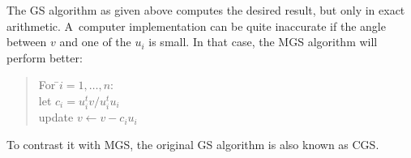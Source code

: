 The \ac{GS} algorithm as given above computes the desired result,
but only in exact arithmetic. A~computer implementation can be quite
inaccurate if the angle between $v$ and one of the $u_i$ is small. In
that case, the \acf{MGS} algorithm will
perform better:

\begin{quote}
  \begin{tabbing}
    For \=$i=1,\ldots,n$:\\
    \>let $c_i=u_i^tv/u_i^tu_i$\\
    \>update $v\leftarrow v-c_iu_i$
  \end{tabbing}
\end{quote}

To contrast it with \ac{MGS}, the original \ac{GS} algorithm is also
known as \acf{CGS}.

